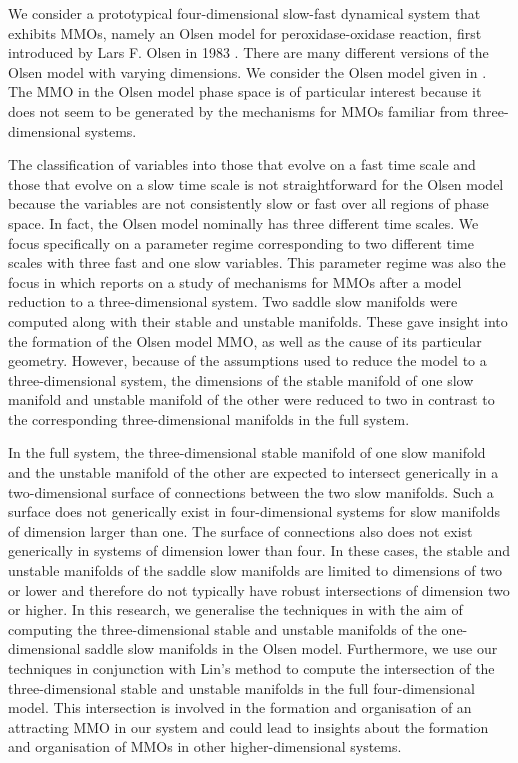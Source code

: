 \documentclass{ws-ijbc}
\begin{document}
We consider a prototypical four-dimensional slow-fast dynamical system that exhibits MMOs, namely an Olsen model for peroxidase-oxidase reaction, first introduced by Lars F. Olsen in 1983  \cite{Olsen}.  There are many different versions of the Olsen model with varying dimensions.  We consider the Olsen model given in \cite{Rescaling}.  The MMO in the Olsen model phase space is of particular interest because it does not seem to be generated by the mechanisms for MMOs familiar from three-dimensional systems.

The classification of variables into those that evolve on a fast time scale and those that evolve on a slow time scale is not straightforward for the Olsen model because the variables are not consistently slow or fast over all regions of phase space.  In fact, the Olsen model nominally has three different time scales.  We focus specifically on a parameter regime corresponding to two different time scales with three fast and one slow variables.  This parameter regime was also the focus in \cite{QSSA} which reports on a study of mechanisms for MMOs after a model reduction to a three-dimensional system.  Two saddle slow manifolds were computed along with their stable and unstable manifolds.  These gave insight into the formation of the Olsen model MMO, as well as the cause of its particular geometry.  However, because of the assumptions used to reduce the model to a three-dimensional system, the dimensions of the stable manifold of one slow manifold and unstable manifold of the other were reduced to two in contrast to the corresponding three-dimensional manifolds in the full system.  

In the full system, the three-dimensional stable manifold of one slow manifold and the unstable manifold of the other are expected to intersect generically in a two-dimensional surface of connections between the two slow manifolds.  Such a surface does not generically exist in four-dimensional systems for slow manifolds of dimension larger than one.  The surface of connections also does not exist generically in systems of dimension lower than four.  In these cases, the stable and unstable manifolds of the saddle slow manifolds are limited to dimensions of two or lower and therefore do not typically have robust intersections of dimension two or higher.  In this research, we generalise the techniques in \cite{Saeed_Paper} with the aim of computing the three-dimensional stable and unstable manifolds of the one-dimensional saddle slow manifolds in the Olsen model.  Furthermore, we use our techniques in conjunction with Lin's method to compute the intersection of the three-dimensional stable and unstable manifolds in the full four-dimensional model.  This intersection is involved in the formation and organisation of an attracting MMO in our system and could lead to insights about the formation and organisation of MMOs in other higher-dimensional systems.
\end{document}
